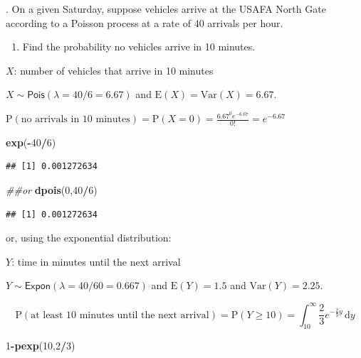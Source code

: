 \documentclass[
]{book}
\newenvironment{Shaded}{\begin{snugshade}}{\end{snugshade}}
\newcommand{\CommentTok}[1]{\textcolor[rgb]{0.56,0.35,0.01}{\textit{#1}}}
\newcommand{\DecValTok}[1]{\textcolor[rgb]{0.00,0.00,0.81}{#1}}
\newcommand{\KeywordTok}[1]{\textcolor[rgb]{0.13,0.29,0.53}{\textbf{#1}}}
\newcommand{\NormalTok}[1]{#1}
\newcommand{\OperatorTok}[1]{\textcolor[rgb]{0.81,0.36,0.00}{\textbf{#1}}}
\providecommand{\tightlist}{%
  \setlength{\itemsep}{0pt}\setlength{\parskip}{0pt}}
\begin{document}
. On a given Saturday, suppose vehicles arrive at the USAFA North Gate according to a Poisson process at a rate of 40 arrivals per hour.

\begin{enumerate}
\def\labelenumi{\alph{enumi}.}
\tightlist
\item
  Find the probability no vehicles arrive in 10 minutes.
\end{enumerate}

\(X\): number of vehicles that arrive in 10 minutes

\(X\sim \textsf{Pois}(\lambda=40/6=6.67)\) and \(\mbox{E}(X)=\mbox{Var}(X)=6.67\).

\(\mbox{P}(\mbox{no arrivals in 10 minutes})=\mbox{P}(X=0)=\frac{6.67^0 e^{-6.67}}{0!}=e^{-6.67}\)

\begin{Shaded}
\begin{Highlighting}[]
\KeywordTok{exp}\NormalTok{(}\OperatorTok{-}\DecValTok{40}\OperatorTok{/}\DecValTok{6}\NormalTok{)}
\end{Highlighting}
\end{Shaded}

\begin{verbatim}
## [1] 0.001272634
\end{verbatim}

\begin{Shaded}
\begin{Highlighting}[]
\CommentTok{##or}
\KeywordTok{dpois}\NormalTok{(}\DecValTok{0}\NormalTok{,}\DecValTok{40}\OperatorTok{/}\DecValTok{6}\NormalTok{)}
\end{Highlighting}
\end{Shaded}

\begin{verbatim}
## [1] 0.001272634
\end{verbatim}

or, using the exponential distribution:

\(Y\): time in minutes until the next arrival

\(Y\sim \textsf{Expon}(\lambda=40/60=0.667)\) and \(\mbox{E}(Y)=1.5\) and \(\mbox{Var}(Y)=2.25\).

\[
\mbox{P}(\mbox{at least 10 minutes until the next arrival})=\mbox{P}(Y\geq 10)=\int_{10}^\infty \frac{2}{3}e^{-\frac{2}{3}y}\,\mathrm{d}y
\]

\begin{Shaded}
\begin{Highlighting}[]
\DecValTok{1}\OperatorTok{-}\KeywordTok{pexp}\NormalTok{(}\DecValTok{10}\NormalTok{,}\DecValTok{2}\OperatorTok{/}\DecValTok{3}\NormalTok{)}
\end{Highlighting}
\end{Shaded}
\end{document}
